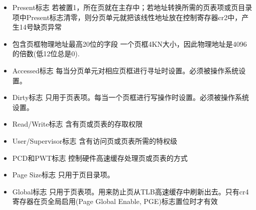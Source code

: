 \begin{itemize}
    \item Present标志
    \subitem 若被置1，所在页就在主存中；若地址转换所需的页表项或页目录项中Present标志清零，则分页单元就把该线性地址放在控制寄存器cr2中，产生14号缺页异常
    \item 包含页框物理地址最高20位的字段
    \subitem 一个页框4KN大小，因此物理地址是4096的倍数(低12位总是0).
    \item Accessed标志
    \subitem 每当分页单元对相应页框进行寻址时设置。必须被操作系统设置。
    \item Dirty标志
    \subitem 只用于页表项。每当一个页框进行写操作时设置。必须被操作系统设置。
    \item Read/Write标志
    \subitem 含有页或页表的存取权限
    \item User/Supervisor标志
    \subitem 含有访问页或页表所需的特权级
    \item PCD和PWT标志
    \subitem 控制硬件高速缓存处理页或页表的方式
    \item Page Size标志
    \subitem 只用于页目录项。
    \item Global标志
    \subitem 只用于页表项。用来防止页从TLB高速缓存中刷新出去。只有cr4寄存器在页全局启用(Page Global Enable, PGE)标志置位时才有效
\end{itemize}
